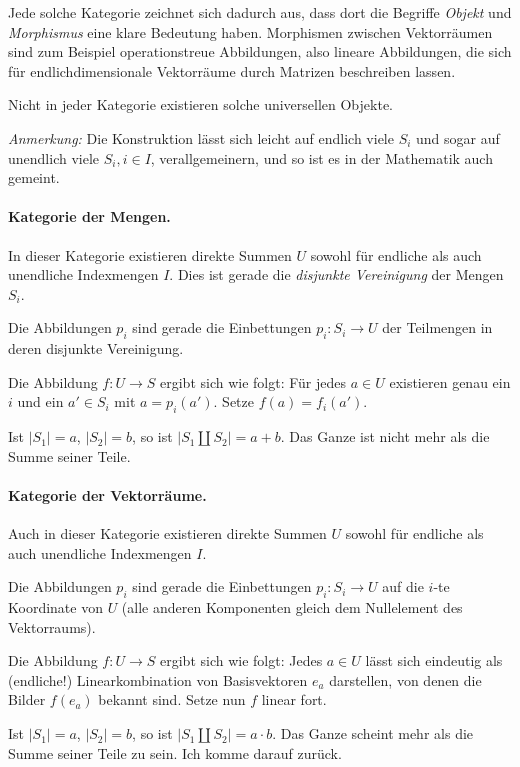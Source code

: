 \documentclass[11pt,a4paper]{article}
\begin{document}
Jede solche Kategorie zeichnet sich dadurch aus, dass dort die Begriffe
\emph{Objekt} und \emph{Morphismus} eine klare Bedeutung haben.  Morphismen
zwischen Vektorräumen sind zum Beispiel operationstreue Abbildungen, also
lineare Abbildungen, die sich für endlichdimensionale Vektorräume durch
Matrizen beschreiben lassen.

Nicht in jeder Kategorie existieren solche universellen Objekte.

\emph{Anmerkung:} Die Konstruktion lässt sich leicht auf endlich viele $S_i$
und sogar auf unendlich viele $S_i, i\in I$, verallgemeinern, und so ist es in
der Mathematik auch gemeint.

\paragraph{Kategorie der Mengen.}
In dieser Kategorie existieren direkte Summen $U$ sowohl für endliche als auch
unendliche Indexmengen $I$. Dies ist gerade die \emph{disjunkte Vereinigung}
der Mengen $S_i$.

Die Abbildungen $p_i$ sind gerade die Einbettungen $p_i: S_i \rightarrow U$
der Teilmengen in deren disjunkte Vereinigung.

Die Abbildung $f: U \rightarrow S$ ergibt sich wie folgt: Für jedes $a\in U$
existieren genau ein $i$ und ein $a'\in S_i$ mit $a=p_i(a')$. Setze
$f(a)=f_i(a')$.

Ist $|S_1| = a$, $|S_2| = b$, so ist $|S_1\coprod S_2| = a+b$.  Das Ganze ist
nicht mehr als die Summe seiner Teile.

\paragraph{Kategorie der Vektorräume.}
Auch in dieser Kategorie existieren direkte Summen $U$ sowohl für endliche als
auch unendliche Indexmengen $I$.

Die Abbildungen $p_i$ sind gerade die Einbettungen $p_i: S_i \rightarrow U$
auf die $i$-te Koordinate von $U$ (alle anderen Komponenten gleich dem
Nullelement des Vektorraums).

Die Abbildung $f: U \rightarrow S$ ergibt sich wie folgt: Jedes $a\in U$ lässt
sich eindeutig als (endliche!) Linearkombination von Basisvektoren $e_a$
darstellen, von denen die Bilder $f(e_a)$ bekannt sind. Setze nun $f$ linear
fort.

Ist $|S_1| = a$, $|S_2| = b$, so ist $|S_1\coprod S_2| = a \cdot b$.  Das
Ganze scheint mehr als die Summe seiner Teile zu sein. Ich komme darauf
zurück.
\end{document}
